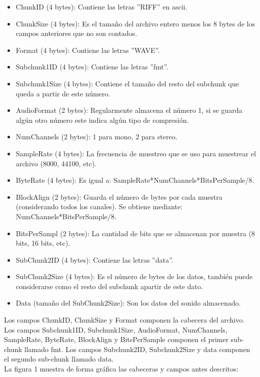 \begin{itemize}
	\item ChunkID (4 bytes): Contiene las letras ''RIFF'' en ascii.
	\item ChunkSize (4 bytes): Es el tamaño del archivo entero menos los 8 bytes de los campos anteriores que no son contados.
	\item Format (4 bytes): Contiene las letras ''WAVE''.
	\item Subchunk1ID (4 bytes): Contiene las letras ''fmt''.
	\item Subchunk1Size (4 bytes): Contiene el tamaño del resto del subchunk que queda a partir de este número.
	\item AudioFormat (2 bytes): Regularmente almacena el número 1, si se guarda algún otro número este indica algún tipo de compresión.
	\item NumChannels (2 bytes): 1 para mono, 2 para stereo.
	\item SampleRate (4 bytes): La frecuencia de muestreo que se uso para muestrear el archivo (8000, 44100, etc).
	\item ByteRate (4 bytes): Es igual a: SampleRate*NumChannels*BitsPerSample/8.
	\item BlockAlign (2 bytes): Guarda el número de bytes por cada muestra (considerando todos los canales). Se obtiene mediante: NumChannels*BitsPerSample/8.
	\item BitsPerSampl (2 bytes): La cantidad de bits que se almacenan por muestra (8 bits, 16 bits, etc).
	\item SubChunk2ID (4 bytes): Contiene las letras ''data''.
	\item SubChunk2Size (4 bytes): Es el número de bytes de los datos, también puede considerarse como el resto del subchunk apartir de este dato.
	\item Data (tamaño del SubChunk2Size): Son los datos del sonido almacenado. 
\end{itemize}
Los campos ChunkID, ChunkSize y Format componen la cabecera del archivo. Los campos Subchunk1ID, Subchunk1Size, AudioFormat, NumChannels, SampleRate, ByteRate, BlockAlign y BitsPerSample componen el primer sub-chunk llamado fmt. Los campos Subchunk2ID, Subchunk2Size y data componen el segundo sub-chunk llamado data.\\ La figura 1 muestra de forma gráfica las cabeceras y campos antes descritos:
